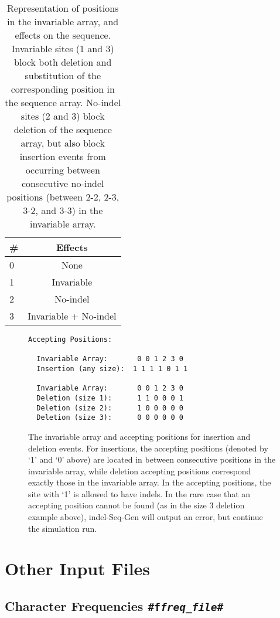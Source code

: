 \documentclass[10pt]{article}
\begin{document}
\begin{table}[Htbp]
\caption{Representation of positions in the invariable array, and effects on the sequence.
Invariable sites (1 and 3) block both deletion and substitution of the corresponding position 
in the sequence array.  No-indel sites (2 and 3) block deletion of the sequence array, but 
also block insertion events from occurring between consecutive no-indel positions (between 
2-2, 2-3, 3-2, and 3-3) in the invariable array.}
\centering
\begin{tabular}{|l|c|}
\hline
\# & Effects \\
\hline
0 & None \\
1 & Invariable \\
2 & No-indel \\
3 & Invariable + No-indel  \\
\hline
\end{tabular}
\label{tab:invariable}
\end{table}

\begin{figure}[Htbp]
\begin{verbatim}
Accepting Positions:

  Invariable Array:       0 0 1 2 3 0
  Insertion (any size):  1 1 1 1 0 1 1

  Invariable Array:       0 0 1 2 3 0
  Deletion (size 1):      1 1 0 0 0 1
  Deletion (size 2):      1 0 0 0 0 0
  Deletion (size 3):      0 0 0 0 0 0

\end{verbatim}
\caption{The invariable array and accepting positions for insertion and deletion 
events. For insertions, the accepting positions (denoted by `1' and `0' above) are located in 
between consecutive positions in the invariable array, while deletion accepting positions 
correspond exactly those in the invariable array.  In the accepting positions, the site with 
`1' is allowed to have indels. In the rare case that an accepting position cannot be found (as 
in the size 3 deletion example above), indel-Seq-Gen will output an error, but continue the
simulation run.}
\label{fig:placement}
\end{figure}

\section{Other Input Files}

\subsection{Character Frequencies {\tt \#f{\it freq\_file}\#}}
\end{document}
